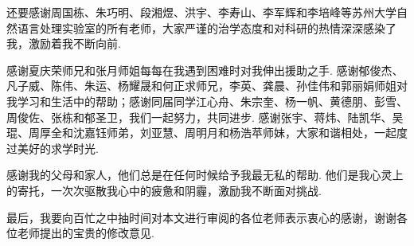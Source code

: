还要感谢周国栋、朱巧明、段湘煜、洪宇、李寿山、李军辉和李培峰等苏州大学自然语言处理实验室的所有老师，大家严谨的治学态度和对科研的热情深深感染了我，激励着我不断向前.

感谢夏庆荣师兄和张月师姐每每在我遇到困难时对我伸出援助之手. 感谢郁俊杰、凡子威、陈伟、朱运、杨耀晟和何正求师兄，李英、龚晨、孙佳伟和郭丽娟师姐对我学习和生活中的帮助；感谢同届同学江心舟、朱宗奎、杨一帆、黄德朋、彭雪、周俊佐、张栋和郁圣卫，我们一起努力，共同进步. 感谢张宇、蒋炜、陆凯华、吴琨、周厚全和沈嘉钰师弟，刘亚慧、周明月和杨浩苹师妹，大家和谐相处，一起度过美好的求学时光.

感谢我的父母和家人，他们总是在任何时候给予我最无私的帮助. 他们是我心灵上的寄托，一次次驱散我心中的疲惫和阴霾，激励我不断面对挑战.

最后，我要向百忙之中抽时间对本文进行审阅的各位老师表示衷心的感谢，谢谢各位老师提出的宝贵的修改意见.

